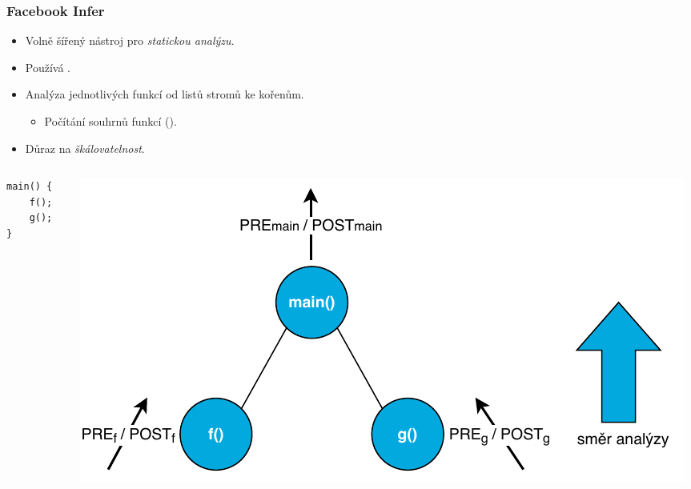 \documentclass[10pt, xcolor=pdflatex, hyperref={unicode}]{beamer}
\begin{document}
\begin{frame}[fragile]\frametitle{Facebook Infer}
	\begin{itemize}
		\setlength\itemsep{0.5em}

		\item
			Volně šířený nástroj pro \emph{statickou analýzu}.

		\item
			Používá .

		\item
			Analýza jednotlivých funkcí od listů stromů ke kořenům.

			\begin{itemize}
				\setlength\itemsep{0.5em}

				\item
					Počítání souhrnů funkcí ().
			\end{itemize}

		\item
			Důraz na \emph{škálovatelnost}.
	\end{itemize}

	\begin{columns}
		\begin{column}{0.3 \linewidth}
			\centering

			\begin{lstlisting}
main() {
	f();
	g();
}
			\end{lstlisting}
		\end{column}

		\begin{column}{0.7 \linewidth}
			\centering
			\includegraphics[width=1 \linewidth]{img/infer.pdf}
		\end{column}
	\end{columns}
\end{frame}
\end{document}
